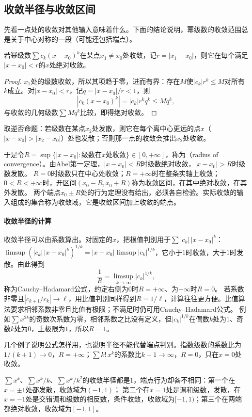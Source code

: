 \subsection{收敛半径与收敛区间}
\label{sec:ru-radius-of-convergence}

先看一点处的收敛对其他输入意味着什么。下面的结论说明，幂级数的收敛范围总是关于中心对称的一段（可能还包括端点）。
\begin{theorem}[Abel第一定理]
\label{thm:ru-abel-lemma}
若幂级数$\sum c_k(x-x_0)^k$在某点$x_1\neq x_0$处收敛，记$r=|x_1-x_0|$，则它在每个满足$|x-x_0|<r$的$x$处绝对收敛。
\end{theorem}
\begin{proof}
$x_1$处的级数收敛，所以其项趋于零，进而有界：存在$M$使$|c_k|r^k\leq M$对所有$k$成立。对$|x-x_0|<r$，记$q=|x-x_0|/r<1$，则
\[
 |c_k(x-x_0)^k|=|c_k|r^kq^k\leq Mq^k,
\]
与收敛的几何级数$\sum Mq^k$比较，即得绝对收敛。
\end{proof}
取逆否命题：若级数在某点$x_2$处发散，则它在每个离中心更远的点$x$（$|x-x_0|>|x_2-x_0|$）处也发散；否则那一点的收敛会推出$x_2$处收敛。

于是令$R=\sup\{|x-x_0|:\text{级数在}x\text{处收敛}\}\in[0,+\infty]$，称为（radius of convergence）。由Abel第一定理，$|x-x_0|<R$时级数绝对收敛，$|x-x_0|>R$时级数发散。
$R=0$时级数只在中心处收敛；$R=+\infty$时在整条实轴上收敛；$0<R<+\infty$时，开区间$(x_0-R,x_0+R)$称为收敛区间，在其中绝对收敛，在其外发散。
两个端点$x_0\pm R$处的行为定理没有给出，必须各自检验。实际收敛的输入组成的集合称为收敛域，它是收敛区间加上收敛的端点。

\paragraph{收敛半径的计算}
收敛半径可以由系数算出。对固定的$x$，把根值判别用于$\sum|c_k|\,|x-x_0|^k$：$\limsup(|c_k|\,|x-x_0|^k)^{1/k}=|x-x_0|\limsup|c_k|^{1/k}$，它小于$1$时收敛，大于$1$时发散。由此得到
\[
 \frac1R=\limsup_{k\to\infty}|c_k|^{1/k},
\]
称为Cauchy--Hadamard公式，约定右侧为$0$时$R=+\infty$、为$+\infty$时$R=0$。
若系数非零且$|c_{k+1}/c_k|\to\ell$，用比值判别同样得到$R=1/\ell$，计算往往更方便。比值算法要求相邻系数非零且比值有极限；不满足时仍可用Cauchy--Hadamard公式。
例如$\sum x^{2k}$的奇数次系数为零，相邻系数之比没有定义，但$|c_k|^{1/k}$在偶数$k$处为$1$、奇数$k$处为$0$，上极限为$1$，所以$R=1$。

几个例子说明公式怎样用，也说明半径不能代替端点判别。指数级数的系数比为$1/(k+1)\to0$，$R=+\infty$；$\sum k!\,x^k$的系数比$k+1\to\infty$，$R=0$，只在$x=0$处收敛。
\begin{example}[收敛半径相同而端点行为不同]
\label{ex:ru-same-radius-different-endpoints}
$\sum x^k$、$\sum x^k/k$、$\sum x^k/k^2$的收敛半径都是$1$，端点行为却各不相同：第一个在$x=\pm1$处都发散，收敛域为$(-1,1)$；
第二个在$x=1$处是调和级数，发散，在$x=-1$处是交错调和级数的相反数，条件收敛，收敛域为$[-1,1)$；第三个在两端都绝对收敛，收敛域为$[-1,1]$。
\end{example}

